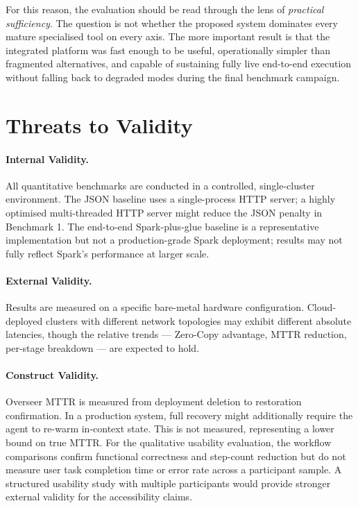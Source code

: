 \documentclass[12pt, a4paper]{report}
\begin{document}
For this reason, the evaluation should be read through the lens of \emph{practical
sufficiency}. The question is not whether the proposed system dominates every mature
specialised tool on every axis. The more important result is that the integrated
platform was fast enough to be useful, operationally simpler than fragmented
alternatives, and capable of sustaining fully live end-to-end execution without
falling back to degraded modes during the final benchmark campaign.

\section{Threats to Validity}
\label{sec:threats}

\paragraph{Internal Validity.}
All quantitative benchmarks are conducted in a controlled, single-cluster environment.
The JSON baseline uses a single-process HTTP server; a highly optimised multi-threaded
HTTP server might reduce the JSON penalty in Benchmark 1.
The end-to-end Spark-plus-glue baseline is a representative implementation but not
a production-grade Spark deployment; results may not fully reflect Spark's performance
at larger scale.

\paragraph{External Validity.}
Results are measured on a specific bare-metal hardware configuration.
Cloud-deployed clusters with different network topologies may exhibit different
absolute latencies, though the relative trends — Zero-Copy advantage, MTTR reduction,
per-stage breakdown — are expected to hold.

\paragraph{Construct Validity.}
Overseer MTTR is measured from deployment deletion to restoration confirmation.
In a production system, full recovery might additionally require the agent to
re-warm in-context state.
This is not measured, representing a lower bound on true MTTR.
For the qualitative usability evaluation, the workflow comparisons confirm functional
correctness and step-count reduction but do not measure user task completion time or
error rate across a participant sample.
A structured usability study with multiple participants would provide stronger
external validity for the accessibility claims.
\end{document}

